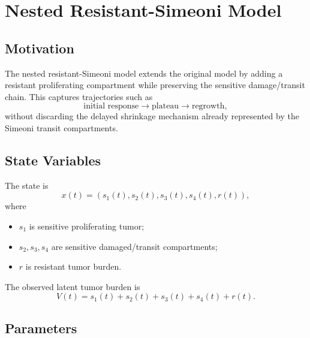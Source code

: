 \documentclass[11pt,a4paper]{article}
\begin{document}
\section{Nested Resistant-Simeoni Model}

\subsection{Motivation}

The nested resistant-Simeoni model extends the original model by adding a resistant proliferating compartment while preserving the sensitive damage/transit chain. This captures trajectories such as
\[
    \text{initial response} \rightarrow \text{plateau} \rightarrow \text{regrowth},
\]
without discarding the delayed shrinkage mechanism already represented by the Simeoni transit compartments.

\subsection{State Variables}

The state is
\[
    x(t)=(s_1(t),s_2(t),s_3(t),s_4(t),r(t)),
\]
where
\begin{itemize}[leftmargin=2em]
    \item $s_1$ is sensitive proliferating tumor;
    \item $s_2,s_3,s_4$ are sensitive damaged/transit compartments;
    \item $r$ is resistant tumor burden.
\end{itemize}
The observed latent tumor burden is
\[
    V(t)=s_1(t)+s_2(t)+s_3(t)+s_4(t)+r(t).
\]

\subsection{Parameters}
\end{document}
